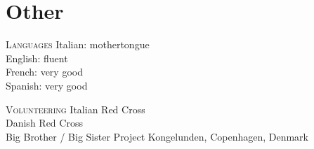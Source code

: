 \section*{Other}

\begin{paracol}{2}
  \textsc{Languages}
\switchcolumn
  Italian: mothertongue\\
  English: fluent\\
  French: very good\\
  Spanish: very good
\end{paracol}

\vspace{1em}

\begin{paracol}{2}
  \textsc{Volunteering}
\switchcolumn
  Italian Red Cross\\
  Danish Red Cross\\
  Big Brother / Big Sister Project Kongelunden, Copenhagen, Denmark
\end{paracol}